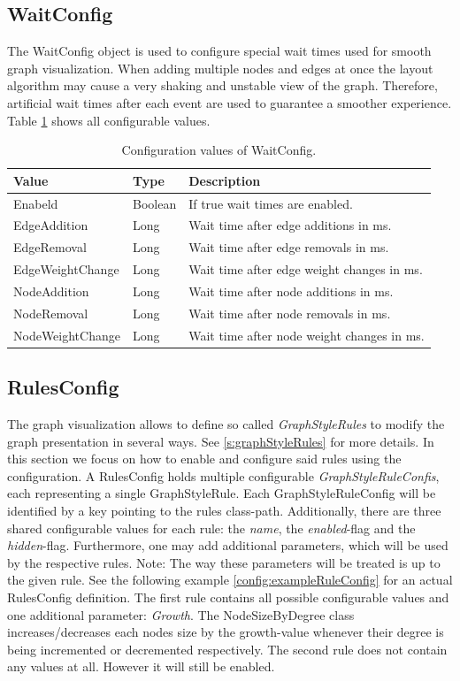 \subsection{WaitConfig}
\label{ss:waitConfig}
The WaitConfig object is used to configure special wait times used for smooth graph visualization. When adding multiple nodes and edges at once the layout algorithm may cause a very shaking and unstable view of the graph. Therefore, artificial wait times after each event are used to guarantee a smoother experience. Table \ref{tab:waitConfigValues} shows all configurable values.

\begin{table}[h]
\centering
\begin{tabular}[h]{|l|l|l|}\hline
	\textbf{Value} & \textbf{Type} & \textbf{Description}\\
	\hline
	Enabeld & Boolean & If true wait times are enabled.\\
	\hline
	EdgeAddition & Long & Wait time after edge additions in ms.\\
	\hline
	EdgeRemoval & Long & Wait time after edge removals in ms.\\
	\hline
	EdgeWeightChange & Long & Wait time after edge weight changes in ms.\\
	\hline
	NodeAddition & Long & Wait time after node additions in ms.\\
	\hline
	NodeRemoval & Long & Wait time after node removals in ms.\\
	\hline
	NodeWeightChange & Long & Wait time after node weight changes in ms.\\
	\hline
\end{tabular}
\caption{Configuration values of WaitConfig.}
\label{tab:waitConfigValues}
\end{table}

\subsection{RulesConfig}
\label{ss:rulesConfig}
The graph visualization allows to define so called \emph{GraphStyleRules} to modify the graph presentation in several ways. See \ref{s:graphStyleRules} for more details. In this section we focus on how to enable and configure said rules using the configuration. A RulesConfig holds multiple configurable \emph{GraphStyleRuleConfis}, each representing a single GraphStyleRule. Each GraphStyleRuleConfig will be identified by a key pointing to the rules class-path. Additionally, there are three shared configurable values for each rule: the \emph{name}, the \emph{enabled}-flag and the \emph{hidden}-flag. Furthermore, one may add additional parameters, which will be used by the respective rules. Note: The way these parameters will be treated is up to the given rule. See the following example \ref{config:exampleRuleConfig} for an actual RulesConfig definition. The first rule contains all possible configurable values and one additional parameter: \emph{Growth}. The NodeSizeByDegree class increases/decreases each nodes size by the growth-value whenever their degree is being incremented or decremented respectively. The second rule does not contain any values at all. However it will still be enabled.

